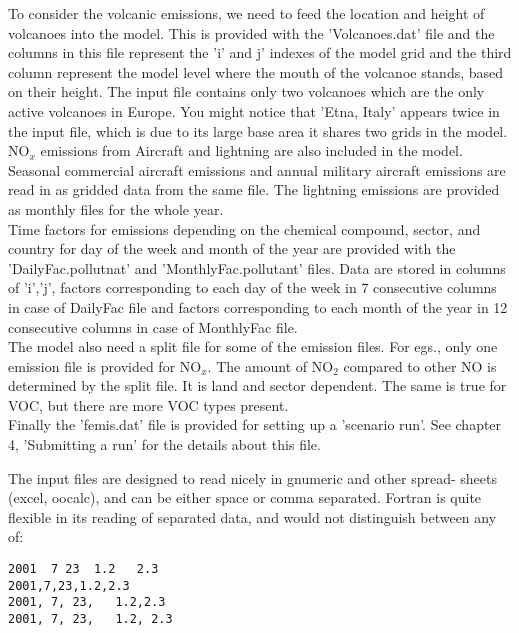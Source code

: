 To consider the volcanic emissions, we need to feed the location and
height of volcanoes into the model.  This is provided with the
'Volcanoes.dat' file and the columns in this file represent the 'i'
and j' indexes of the model grid and the third column represent the
model level where the mouth of the volcanoe stands, based on their
height.  The input file contains only two volcanoes which are the only
active volcanoes in Europe.  You might notice that 'Etna, Italy'
appears twice in the input file, which is due to its large base area
it shares two grids in the model.  \\
     

NO$_{x}$ emissions from Aircraft and lightning are also included in the
model. Seasonal commercial aircraft emissions and annual military
aircraft emissions are read in as gridded data from the same file.
The lightning emissions are provided as monthly files for the whole
year.      \\

Time factors for emissions depending on the chemical compound, sector,
and country for day of the week and month of the year are provided with
the 'DailyFac.pollutnat' and 'MonthlyFac.pollutant' files.  Data are
stored in columns of 'i','j', factors corresponding to each day of the
week in 7 consecutive columns in case of DailyFac file and factors
corresponding to each month of the year in 12 consecutive columns in
case of MonthlyFac file.\\  

The model also need a split file for some of the emission files.  For
egs., only one emission file is provided for NO$_{x}$.  The amount of
NO$_{2}$ compared to other NO is determined by the split file.  It is
land and sector dependent.  The same is true for VOC, but
there are more VOC types present. \\ 

Finally the 'femis.dat' file is provided for setting up a 'scenario run'.  See
chapter 4, 'Submitting a run' for the details about this file.  

 
\bigskip

 The input files are designed to read nicely in gnumeric and other spread-
 sheets (excel, oocalc), and can be either space or comma separated.
 Fortran is quite flexible in its reading of separated data, and
would not distinguish between any of:
\begin{verbatim}
2001  7 23  1.2   2.3
2001,7,23,1.2,2.3
2001, 7, 23,   1.2,2.3
2001, 7, 23,   1.2, 2.3
\end{verbatim}

